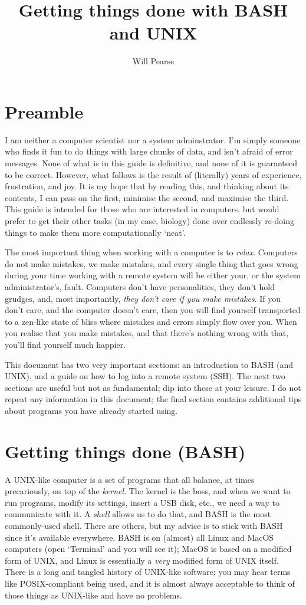 \documentclass[12pt]{report}
\begin{document}
\title{Getting things done with BASH and UNIX}
\author{Will Pearse}
\maketitle

\section{Preamble}
I am neither a computer scientist nor a system adminstrator. I'm
simply someone who finds it fun to do things with large chunks of
data, and isn't afraid of error messages. None of what is in this
guide is definitive, and none of it is guaranteed to be
correct. However, what follows is the result of (literally) years of
experience, frustration, and joy. It is my hope that by reading this,
and thinking about its contents, I can pass on the first, minimise the
second, and maximise the third. This guide is intended for those who
are interested in computers, but would prefer to get their other tasks
(in my case, biology) done over endlessly re-doing things to make them
more computationally `neat'.

The most important thing when working with a computer is to
\emph{relax}. Computers do not make mistakes, we make mistakes, and
every single thing that goes wrong during your time working with a
remote system will be either your, or the system administrator's,
fault. Computers don't have personalities, they don't hold grudges,
and, most importantly, \emph{they don't care if you make mistakes}. If
you don't care, and the computer doesn't care, then you will find
yourself transported to a zen-like state of bliss where mistakes and
errors simply flow over you. When you realise that you make mistakes,
and that there's nothing wrong with that, you'll find yourself much
happier.

This document has two very important sections: an introduction to BASH
(and UNIX), and a guide on how to log into a remote system (SSH). The
next two sections are useful but not as fundamental; dip into these at
your leisure. I do not repeat any information in this document; the
final section contains additional tips about programs you have already
started using.
\section{Getting things done (BASH)}
A UNIX-like computer is a set of programs that all balance, at times
precariously, on top of the \emph{kernel}. The kernel is the boss, and
when we want to run programs, modify its settings, insert a USB disk,
etc., we need a way to communicate with it. A \emph{shell} allows us
to do that, and BASH is the most commonly-used shell. There are
others, but my advice is to stick with BASH since it's available
everywhere. BASH is on (almost) all Linux and MacOS computers (open
`Terminal' and you will see it); MacOS is based on a modified form of
UNIX, and Linux is essentially a \emph{very} modified form of UNIX
itself. There is a long and tangled history of UNIX-like software; you
may hear terms like POSIX-compliant being used, and it is almost
always acceptable to think of those things as UNIX-like and have no
problems.
\end{document}
